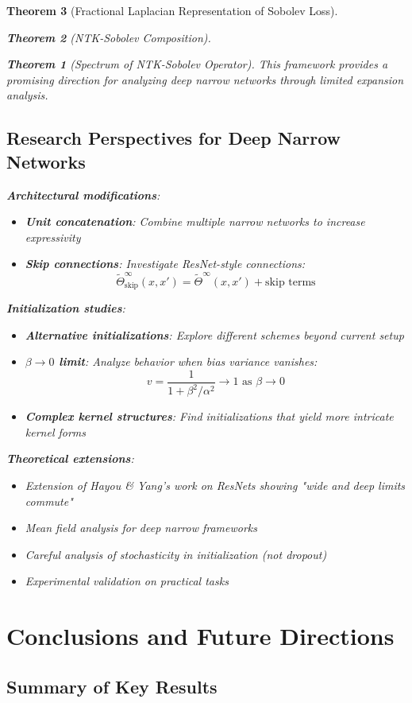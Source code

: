 \documentclass{article}
\newtheorem{theorem}{Theorem}[section]
\begin{document}
\begin{theorem}[Fractional Laplacian Representation of Sobolev Loss]
\begin{theorem}[NTK-Sobolev Composition]
\begin{theorem}[Spectrum of NTK-Sobolev Operator]
This framework provides a promising direction for analyzing deep narrow networks through limited expansion analysis.

\subsection{Research Perspectives for Deep Narrow Networks}

\textbf{Architectural modifications}:
   \begin{itemize}
\item \textbf{Unit concatenation}: Combine multiple narrow networks to increase expressivity
\item \textbf{Skip connections}: Investigate ResNet-style connections:
  \[ \tilde{\Theta}^\infty_{\text{skip}}(x, x') = \tilde{\Theta}^\infty(x, x') + \text{skip terms} \]
   \end{itemize}

\textbf{Initialization studies}:
\begin{itemize}
\item \textbf{Alternative initializations}: Explore different schemes beyond current setup
\item \textbf{$\beta \to 0$ limit}: Analyze behavior when bias variance vanishes:
  \[ v = \frac{1}{1 + \beta^2/\alpha^2} \to 1 \text{ as } \beta \to 0 \]
\item \textbf{Complex kernel structures}: Find initializations that yield more intricate kernel forms
\end{itemize}

\textbf{Theoretical extensions}:
\begin{itemize}
\item Extension of Hayou \& Yang's work on ResNets showing "wide and deep limits commute"
\item Mean field analysis for deep narrow frameworks
\item Careful analysis of stochasticity in initialization (not dropout)
\item Experimental validation on practical tasks
\end{itemize}

\section{Conclusions and Future Directions}

\subsection{Summary of Key Results}


\end{theorem}
\end{theorem}
\end{theorem}
\end{document}
